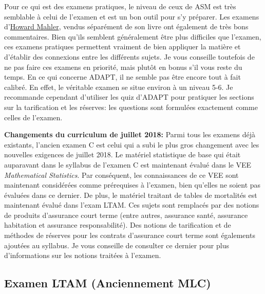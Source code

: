 Pour ce qui est des examens pratiques, le niveau de ceux de ASM est très semblable à celui de l'examen et est un bon outil pour s'y préparer. Les examens d'\href{http://howardmahler.com/Teaching/C.html}{Howard Mahler}, vendus séparément de son livre ont également de très bons commentaires. Bien qu'ils semblent généralement être plus difficiles que l'examen, ces examens pratiques permettent vraiment de bien appliquer la matière et d'établir des connexions entre les différents sujets. Je vous conseille toutefois de ne pas faire ces examens en priorité, mais plutôt en bonus s'il vous reste du temps. En ce qui concerne ADAPT, il ne semble pas être encore tout à fait calibré. En effet, le véritable examen se situe environ à un niveau 5-6. Je recommande cependant d'utiliser les quiz d'ADAPT pour pratiquer les sections sur la tarification et les réserves: les questions sont formulées exactement comme celles de l'examen. \vspace{\baselineskip}

\textbf{Changements du curriculum de juillet 2018:} Parmi tous les examens déjà existants, l'ancien examen C est celui qui a subi le plus gros changement avec les nouvelles exigences de juillet 2018. Le matériel statistique de base qui était auparavant dans le syllabus de l'examen C est maintenant évalué dans le VEE \textit{Mathematical Statistics}. Par conséquent, les connaissances de ce VEE sont maintenant considérées comme prérequises à l'examen, bien qu'elles ne soient pas évaluées dans ce dernier. De plus, le matériel traitant de tables de mortalités est maintenant évalué dans l'exam LTAM. Ces sujets sont remplacés par des notions de produits d'assurance court terme (entre autres, assurance santé, assurance habitation et assurance responsabilité). Des notions de tarification et de méthodes de réserves pour les contrats d'assurance court terme sont égalements ajoutées au syllabus. Je vous conseille de consulter ce dernier pour plus d'informations sur les notions traitées à l'examen. \vspace{\baselineskip}

\newpage


\subsection*{Examen LTAM (Anciennement MLC)}
\label{subsec:examltam}

